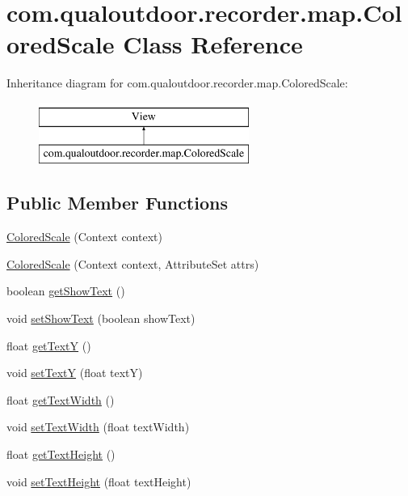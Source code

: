 \hypertarget{classcom_1_1qualoutdoor_1_1recorder_1_1map_1_1ColoredScale}{\section{com.\-qualoutdoor.\-recorder.\-map.\-Colored\-Scale Class Reference}
\label{classcom_1_1qualoutdoor_1_1recorder_1_1map_1_1ColoredScale}
}
Inheritance diagram for com.\-qualoutdoor.\-recorder.\-map.\-Colored\-Scale\-:\begin{figure}[H]
\begin{center}
\leavevmode
\includegraphics[height=2.000000cm]{classcom_1_1qualoutdoor_1_1recorder_1_1map_1_1ColoredScale}
\end{center}
\end{figure}
\subsection*{Public Member Functions}
\begin{DoxyCompactItemize}
\item 
\hyperlink{classcom_1_1qualoutdoor_1_1recorder_1_1map_1_1ColoredScale_aa55ac3d9ba5be9d14840830681e52e2d}{Colored\-Scale} (Context context)
\item 
\hyperlink{classcom_1_1qualoutdoor_1_1recorder_1_1map_1_1ColoredScale_ab945cb4bff3bb2bc529197fc9c7ed3d5}{Colored\-Scale} (Context context, Attribute\-Set attrs)
\item 
boolean \hyperlink{classcom_1_1qualoutdoor_1_1recorder_1_1map_1_1ColoredScale_a4fea7eb8fd4576d8ccafea91515848b1}{get\-Show\-Text} ()
\item 
void \hyperlink{classcom_1_1qualoutdoor_1_1recorder_1_1map_1_1ColoredScale_a5e8e2c07ea98d8583ada6ce92c69f789}{set\-Show\-Text} (boolean show\-Text)
\item 
float \hyperlink{classcom_1_1qualoutdoor_1_1recorder_1_1map_1_1ColoredScale_a3244dd95dd06a4d1ae7dd73f95509022}{get\-Text\-Y} ()
\item 
void \hyperlink{classcom_1_1qualoutdoor_1_1recorder_1_1map_1_1ColoredScale_a4f0ee3e627c89804b6e99cce9a7ca837}{set\-Text\-Y} (float text\-Y)
\item 
float \hyperlink{classcom_1_1qualoutdoor_1_1recorder_1_1map_1_1ColoredScale_a0f4b620c63df88430c1bf482872b4f38}{get\-Text\-Width} ()
\item 
void \hyperlink{classcom_1_1qualoutdoor_1_1recorder_1_1map_1_1ColoredScale_ad271444a49aeb6230a5f60321826f9b4}{set\-Text\-Width} (float text\-Width)
\item 
float \hyperlink{classcom_1_1qualoutdoor_1_1recorder_1_1map_1_1ColoredScale_a1c6d7f61f9909fd3d35e12f9c9dfa03a}{get\-Text\-Height} ()
\item 
void \hyperlink{classcom_1_1qualoutdoor_1_1recorder_1_1map_1_1ColoredScale_aaebda524aa8726568f1055e31777dece}{set\-Text\-Height} (float text\-Height)
\end{DoxyCompactItemize}

